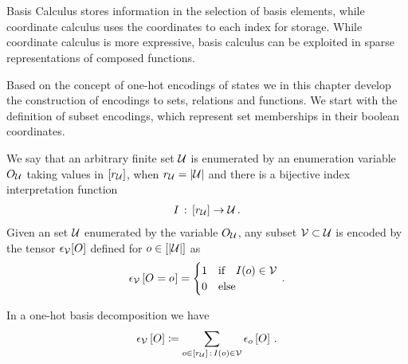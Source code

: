\chapter{\chatextbasisCalculus}\label{cha:basisCalculus}

Basis Calculus stores information in the selection of basis elements, while coordinate calculus uses the coordinates to each index for storage.
While coordinate calculus is more expressive, basis calculus can be exploited in sparse representations of composed functions.



Based on the concept of one-hot encodings of states we in this chapter develop the construction of encodings to sets, relations and functions.
We start with the definition of subset encodings, which represent set memberships in their boolean coordinates.

\begin{definition}
    \label{def:subsetEncoding}
    We say that an arbitrary finite set $\mathcal{U}$ is enumerated by an enumeration variable $O_{\mathcal{U}}$ taking values in $[r_{\mathcal{U}}]$, when $r_{\mathcal{U}}=\left|\mathcal{U}\right|$ and there is a bijective index interpretation function
    \begin{align*}
        I \,:\, [r_{\mathcal{U}}] \rightarrow \mathcal{U} \, .
    \end{align*}
    Given an set $\mathcal{U}$ enumerated by the variable $O_{\mathcal{U}}$, any subset $\mathcal{V}\subset\mathcal{U}$ is encoded by the tensor $\epsilon_{\mathcal{V}}[O]$ defined for $o\in[\left|\mathcal{U}\right|]$ as
    \begin{align*}
        \epsilon_{\mathcal{V}}\left[O_{}=o_{}\right]
        = \begin{cases}
              1 & \text{if}\quad I(o) \in \mathcal{V} \\
              0 & \text{else}
        \end{cases} \, .
    \end{align*}
\end{definition}

In a one-hot basis decomposition we have
\begin{align*}
    \epsilon_{\mathcal{V}}\left[O\right]
    \coloneqq \sum_{o\in[r_{\mathcal{U}}]\,:\,I(o)\in\mathcal{V}}\epsilon_{o}\left[O\right] \, .
\end{align*}


